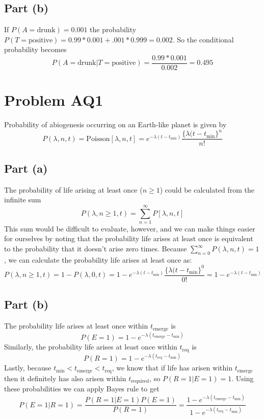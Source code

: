 \documentclass[11pt]{article}
\begin{document}
\subsection*{Part (b)}
If $P(A=\text{drunk})=0.001$ the probability $P(T=\text{positive})=0.99*0.001+.001*0.999=0.002$. So the conditional probability becomes
\begin{equation*}
	P(A=\text{drunk}|T=\text{positive}) = \frac{0.99*0.001}{0.002} = 0.495
\end{equation*}

\section*{Problem AQ1}
Probability of abiogenesis occurring on an Earth-like planet is given by 
\begin{equation*}
	P(\lambda,n,t)=\text{Poisson}[\lambda,n,t]=e^{-\lambda(t-t_\text{min})}\frac{\{\lambda(t-t_\text{min}\}^n}{n!}
\end{equation*}

\subsection*{Part (a)}
The probability of life arising at least once ($n\geq1$) could be calculated from the infinite sum
\begin{equation*}
	P(\lambda,n\geq1,t)=\sum_{n=1}^\infty P[\lambda,n,t]
\end{equation*}
This sum would be difficult to evaluate, however, and we can make things easier for ourselves by noting that the probability life arises at least once is equivalent to the probability that it doesn't arise zero times. Because $\sum_{n=0}^\infty P(\lambda,n,t)=1$, we can calculate the probability life arises at least once as:
\begin{equation*}
	P(\lambda,n\geq1,t) = 1-P(\lambda,0,t)=1-e^{-\lambda(t-t_\text{min})}\frac{\{\lambda(t-t_\text{min}\}^0}{0!} = 1-e^{-\lambda(t-t_\text{min})}
\end{equation*}

\subsection*{Part (b)}
The probability life arises at least once within $t_\text{emerge}$ is 
\begin{equation*}
	P(E=1)=1-e^{-\lambda(t_\text{emerge}-t_\text{min})}
\end{equation*} 
Similarly, the probability life arises at least once within $t_\text{req}$ is
\begin{equation*}
	P(R=1)=1-e^{-\lambda(t_\text{req}-t_\text{min})}
\end{equation*}
Lastly, because $t_\text{min} < t_\text{emerge} < t_\text{req}$, we know that if life has arisen within $t_\text{emerge}$ then it definitely has also arisen within $t_\text{required}$, so $P(R=1|E=1)=1$. Using these probabilities we can apply Bayes rule to get
\begin{equation*}
	P(E=1|R=1) = \frac{P(R=1|E=1)P(E=1)}{P(R=1)} = \frac{1-e^{-\lambda(t_\text{emerge}-t_\text{min})}}{1-e^{-\lambda(t_\text{req}-t_\text{min})}}
\end{equation*}
\end{document}
